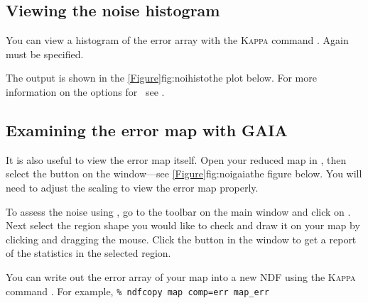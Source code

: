 \subsection{Viewing the noise histogram}

You can view a histogram of the error array with the
\textsc{Kappa} command \histogram. Again  must be
specified.

\begin{terminalv}
\end{terminalv}
The output is shown in the \cref{Figure}{fig:noihisto}{the plot below}.
For more information on the options for \histogram\ see
\kappasun.


\subsection{Examining the error map with GAIA}

It is also useful to view the error map itself. Open your reduced map
in \gaia, then select the  button on the
 window---see
\cref{Figure}{fig:noigaia}{the figure below}. You will need to adjust
the scaling to view the error map properly.

To assess the noise using \gaia, go to the toolbar on the main window
and click on . Next select the region shape you would like to check and
draw it on your map by clicking and dragging the mouse. Click the
 button in the 
window to get a report of the statistics in the selected region.

\begin{tip}
  You can write out the error array of your map into a new NDF using
  the \textsc{Kappa} command \ndfcopy. For example, \texttt{\% ndfcopy
    map comp=err map\_err}
\end{tip}





